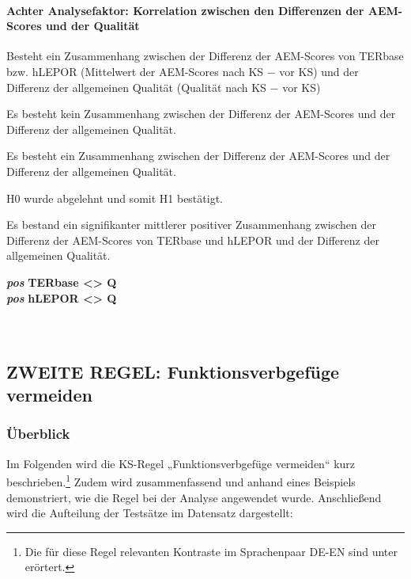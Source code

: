 \paragraph*{Achter Analysefaktor: Korrelation zwischen den Differenzen der AEM-Scores und der Qualität}
\begin{description}[font=\normalfont\bfseries]
\item [Fragestellung:] Besteht ein Zusammenhang zwischen der Differenz der AEM-Scores von TERbase bzw. hLEPOR (Mittelwert der AEM-Scores nach KS $-$ vor KS) und der Differenz der allgemeinen Qualität (Qualität nach KS $-$ vor KS)
\item [H0 --] Es besteht kein Zusammenhang zwischen der Differenz der AEM-Scores und der Differenz der allgemeinen Qualität.
\item [H1 --] Es besteht ein Zusammenhang zwischen der Differenz der AEM-Scores und der Differenz der allgemeinen Qualität.
\item [Resultat]
\end{description}
\parbox[t]{.7\textwidth}{H0 wurde abgelehnt und somit H1 bestätigt.

Es bestand ein signifikanter mittlerer positiver Zusammenhang zwischen der Differenz der AEM-Scores von TERbase und hLEPOR und der Differenz der allgemeinen Qualität.}
\parbox[t]{.04\textwidth}{}
\colorbox{smGreen}{\parbox[t]{.25\textwidth}{\textbf{\textit{pos}} \textbf{TERbase <> Q}\\
\textbf{\textit{pos}} \textbf{hLEPOR <> Q}\\
\\
\\
}}




\subsection{ZWEITE REGEL: Funktionsverbgefüge vermeiden}
\label{sec:5.3.2}

\subsubsection{\label{sec:5.3.2.0}Überblick}

Im Folgenden wird die KS-Regel „Funktionsverbgefüge vermeiden“ kurz beschrieben.\footnote{\textrm{Die für diese Regel relevanten Kontraste im Sprachenpaar DE-EN sind unter  erörtert.} } Zudem wird zusammenfassend und anhand eines Beispiels demonstriert, wie die Regel bei der Analyse angewendet wurde. Anschließend wird die Aufteilung der Testsätze im Datensatz dargestellt:


